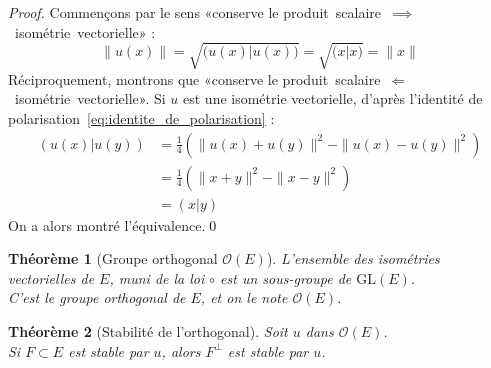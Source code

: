 \documentclass[11pt,a4paper]{report}
\newtheorem{theorem}{Théorème}[chapter]
\theoremstyle{definition}
\begin{document}
\begin{proof}
     Commençons par le sens «{}conserve le produit~scalaire~$\implies$~isométrie~vectorielle»{} : 
     \begin{equation*}
          \|u(x) \| = \sqrt{\big( u(x) | u(x) \big) }= \sqrt{\big( x | x \big) } = \| x \|
     \end{equation*}
     Réciproquement, montrons que «{}conserve le produit~scalaire~$\Longleftarrow$~isométrie~vectorielle»{}.\newline
     Si $u$ est une isométrie vectorielle, d'après l'identité de polarisation~\eqref{eq:identite_de_polarisation} : 
     \begin{align*}
          \left( u(x) | u(y) \right) 
    &= \frac{1}{4} \left( \| u(x) + u(y) \|^2 - \| u(x) - u(y) \|^2 \right) \\
    &= \frac{1}{4} \left( \| x+y \|^2 - \| x-y \|^2 \right) \\ %
    &= (x|y)
     \end{align*}
     On a alors montré l'équivalence.\qed
\end{proof}
\begin{theorem}[Groupe orthogonal $\mathcal{O}(E)$]
     L'ensemble des isométries vectorielles de $E$, muni de la loi $\circ$ est un sous-groupe de $\mathrm{GL}(E)$. \\
     C'est le \emph{groupe orthogonal} de $E$, et on le note $\mathcal{O}(E)$.
\end{theorem}
\begin{theorem}[Stabilité de l'orthogonal]
     Soit $u$ dans $\mathcal{O}(E)$. \\
     Si $F\subset E$ est stable par $u$, alors $F^\perp$ est stable par $u$.
\end{theorem}
\end{document}
